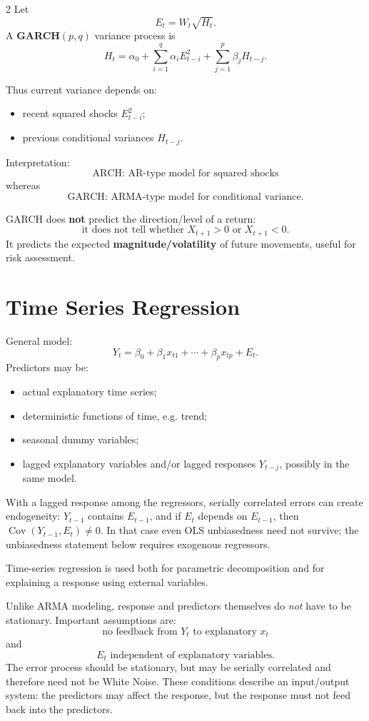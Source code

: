 \documentclass[9pt,a4paper]{extarticle}
\newcommand{\key}[1]{\textbf{#1}}
\begin{document}
\begin{multicols}{2}
Let
\[
E_t=W_t\sqrt{H_t}.
\]
A \key{GARCH\((p,q)\)} variance process is
\[
\boxed{
H_t=\alpha_0+
\sum_{i=1}^{q}\alpha_iE_{t-i}^2+
\sum_{j=1}^{p}\beta_jH_{t-j}.
}
\]

Thus current variance depends on:
\begin{itemize}
\item recent squared shocks \(E_{t-i}^2\);
\item previous conditional variances \(H_{t-j}\).
\end{itemize}

Interpretation:
\[
\boxed{\text{ARCH: AR-type model for squared shocks}}
\]
whereas
\[
\boxed{\text{GARCH: ARMA-type model for conditional variance}.}
\]

GARCH does \key{not} predict the direction/level of a return:
\[
\text{it does not tell whether }X_{t+1}>0\text{ or }X_{t+1}<0.
\]
It predicts the expected \key{magnitude/volatility} of future movements, useful for risk assessment.

\section{Time Series Regression}

General model:
\[
\boxed{
Y_t=\beta_0+\beta_1x_{t1}+\cdots+\beta_px_{tp}+E_t.
}
\]
Predictors may be:
\begin{itemize}
\item actual explanatory time series;
\item deterministic functions of time, e.g. trend;
\item seasonal dummy variables;
\item lagged explanatory variables and/or lagged responses \(Y_{t-j}\), possibly in the same model.
\end{itemize}

With a lagged response among the regressors, serially correlated errors can create endogeneity: \(Y_{t-1}\) contains \(E_{t-1}\), and if \(E_t\) depends on \(E_{t-1}\), then \(\operatorname{Cov}(Y_{t-1},E_t)\neq0\). In that case even OLS unbiasedness need not survive; the unbiasedness statement below requires exogenous regressors.

Time-series regression is used both for parametric decomposition and for explaining a response using external variables.

Unlike ARMA modeling, response and predictors themselves do \emph{not} have to be stationary. Important assumptions are:
\[
\boxed{\text{no feedback from }Y_t\text{ to explanatory }x_t}
\]
and
\[
\boxed{E_t\text{ independent of explanatory variables}.}
\]
The error process should be stationary, but may be serially correlated and therefore need not be White Noise. These conditions describe an input/output system: the predictors may affect the response, but the response must not feed back into the predictors.


\end{multicols}
\end{document}
